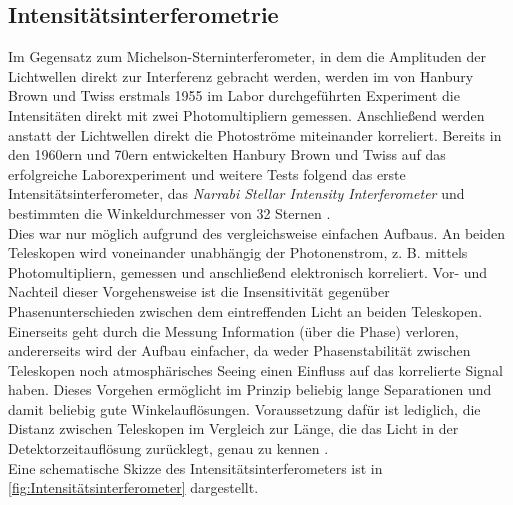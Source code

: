 \subsection{Intensitätsinterferometrie}
\label{ssec:Intensitätsinterferometrie}
Im Gegensatz zum Michelson-Sterninterferometer, in dem die Amplituden der Lichtwellen direkt zur Interferenz gebracht werden, werden im von Hanbury Brown und Twiss erstmals 1955 im Labor durchgeführten Experiment \cite{brownCorrelationPhotonsTwo1956} die Intensitäten direkt mit zwei Photomultipliern gemessen. 
Anschließend werden anstatt der Lichtwellen direkt die Photoströme miteinander korreliert. 
Bereits in den 1960ern und 70ern entwickelten Hanbury Brown und Twiss auf das erfolgreiche Laborexperiment und weitere Tests folgend das erste Intensitätsinterferometer, das \emph{Narrabi Stellar Intensity Interferometer} und bestimmten die Winkeldurchmesser von 32 Sternen \cite[Kap. 1]{brownIntensityInterferometerIts1974}. \\
Dies war nur möglich aufgrund des vergleichsweise einfachen Aufbaus. 
An beiden Teleskopen wird voneinander unabhängig der Photonenstrom, z. B. mittels Photomultipliern, gemessen und anschließend elektronisch korreliert. 
Vor- und Nachteil dieser Vorgehensweise ist die Insensitivität gegenüber Phasenunterschieden zwischen dem eintreffenden Licht an beiden Teleskopen. 
Einerseits geht durch die Messung Information (über die Phase) verloren, andererseits wird der Aufbau einfacher, da weder Phasenstabilität zwischen Teleskopen noch atmosphärisches Seeing einen Einfluss auf das korrelierte Signal haben.
Dieses Vorgehen ermöglicht im Prinzip beliebig lange Separationen und damit beliebig gute Winkelauflösungen. 
Voraussetzung dafür ist lediglich, die Distanz zwischen Teleskopen im Vergleich zur Länge, die das Licht in der Detektorzeitauflösung zurücklegt, genau zu kennen \cite{DemonstrationStellarIntensity}. 
\\
Eine schematische Skizze des Intensitätsinterferometers ist in \autoref{fig:Intensitätsinterferometer} dargestellt. 
